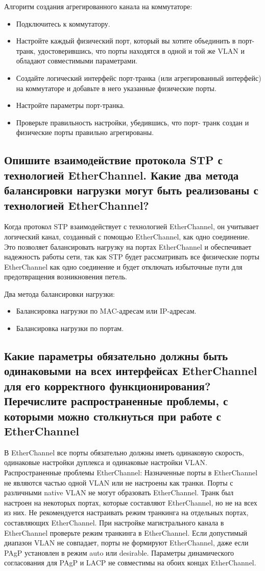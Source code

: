 Алгоритм создания агрегированного канала на коммутаторе:
\begin{itemize}
	\item Подключитесь к коммутатору.
	\item Настройте каждый физический порт, который вы хотите 
		объединить в порт-транк, удостоверившись, что порты находятся в 
		одной и той же VLAN и обладают совместимыми параметрами.
	\item Создайте логический интерфейс порт-транка (или 
		агрегированный интерфейс) на коммутаторе и добавьте в него 
		указанные физические порты.
	\item Настройте параметры порт-транка.
	\item Проверьте правильность настройки, убедившись, что порт-
		транк создан и физические порты правильно агрегированы.
\end{itemize}

\subsection{Опишите взаимодействие протокола STP с технологией 
EtherChannel. Какие два метода балансировки нагрузки могут 
быть реализованы с технологией EtherChannel?}
Когда протокол STP взаимодействует с технологией EtherChannel, он 
учитывает логический канал, созданный с помощью EtherChannel, как одно 
соединение. Это позволяет балансировать нагрузку на портах EtherChannel и 
обеспечивает надежность работы сети, так как STP будет рассматривать все 
физические порты EtherChannel как одно соединение и будет отключать 
избыточные пути для предотвращения возникновения петель.

Два метода балансировки нагрузки:
\begin{itemize}
	\item Балансировка нагрузки по MAC-адресам или IP-адресам.
	\item Балансировка нагрузки по портам.
\end{itemize}

\subsection{Какие параметры обязательно должны быть одинаковыми на 
всех интерфейсах EtherChannel для его корректного 
функционирования? Перечислите распространенные проблемы, 
с которыми можно столкнуться при работе с EtherChannel}
В EtherChannel все порты обязательно должны иметь одинаковую 
скорость, одинаковые настройки дуплекса и одинаковые настройки VLAN.
Распространенные проблемы EtherChannel:
Назначенные порты в EtherChannel не являются частью одной 
VLAN или не настроены как транки. Порты с различными native 
VLAN не могут образовать EtherChannel.
Транк был настроен на некоторых портах, которые составляют 
EtherChannel, но не на всех из них. Не рекомендуется настраивать 
режим транкинга на отдельных портах, составляющих EtherChannel. 
При настройке магистрального канала в EtherChannel проверьте 
режим транкинга в EtherChannel.
Если допустимый диапазон VLAN не совпадает, порты не 
формируют EtherChannel, даже если PAgP установлен в режим auto 
или desirable.
Параметры динамического согласования для PAgP и LACP не 
совместимы на обоих концах EtherChannel.

